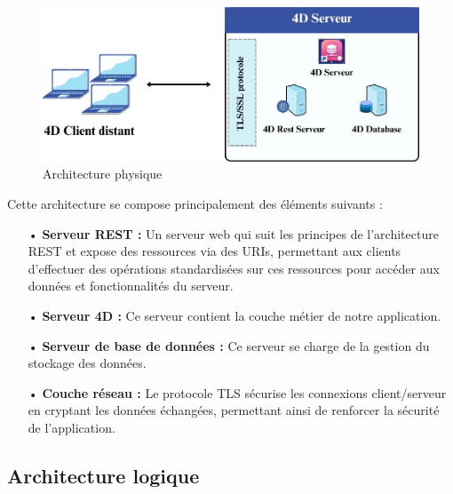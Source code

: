 \begin{figure}[htbp]
   \centering
   \includegraphics[scale=0.6]{Images/physique.jpg} %
   \caption{Architecture physique}
   \label{fig:physiqueArch}
\end{figure}

Cette architecture se compose principalement des éléments suivants :
\begin{itemize}
   \item[•] \textbf{Serveur REST :} Un serveur web qui suit les principes de l’architecture REST et expose des ressources via des URIs, permettant aux clients d’effectuer des opérations standardisées sur ces ressources pour accéder aux données et fonctionnalités du serveur.
   \item[•] \textbf{Serveur 4D :} Ce serveur contient la couche métier de notre application.
   \item[•] \textbf{Serveur de base de données :} Ce serveur se charge de la gestion du stockage des données.
   \item[•] \textbf{Couche réseau :} Le protocole TLS sécurise les connexions client/serveur en cryptant les données échangées, permettant ainsi de renforcer la sécurité de l'application.
\end{itemize}

\subsection{Architecture logique}

